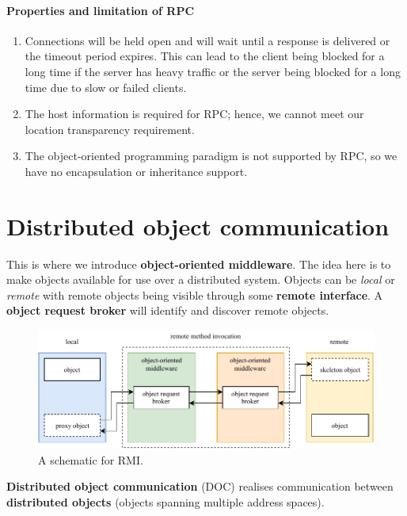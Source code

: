 
\paragraph{Properties and limitation of RPC}
\begin{enumerate}
    \item
        Connections will be held open and will wait until
        a response is delivered or the timeout period expires.
        This can lead to the client being blocked for a long time
        if the server has heavy traffic or the server
        being blocked for a long time due to slow or failed
        clients.

    \item 
        The host information is required for RPC; hence,
        we cannot meet our location transparency
        requirement.

    \item 
        The object-oriented programming paradigm is not
        supported by RPC, so we have no encapsulation or inheritance
        support.
\end{enumerate}

\section{Distributed object communication}

This is where we introduce \textbf{object-oriented middleware}.
The idea here is to make objects available for use over a 
distributed system.
Objects can be \emph{local} or \emph{remote}
with remote objects being visible through some
\textbf{remote interface}.
A \textbf{object request broker} will identify and discover
remote objects.

\begin{figure}[]
    \centering
    \includegraphics[width=0.8\linewidth]{images/rmi.pdf}
    \caption{A schematic for RMI.}%
    \label{fig:rmi}
\end{figure}

\begin{definition}
    \textbf{Distributed object communication} (DOC) realises
    communication between \textbf{distributed objects}
    (objects spanning multiple address spaces).
\end{definition}

